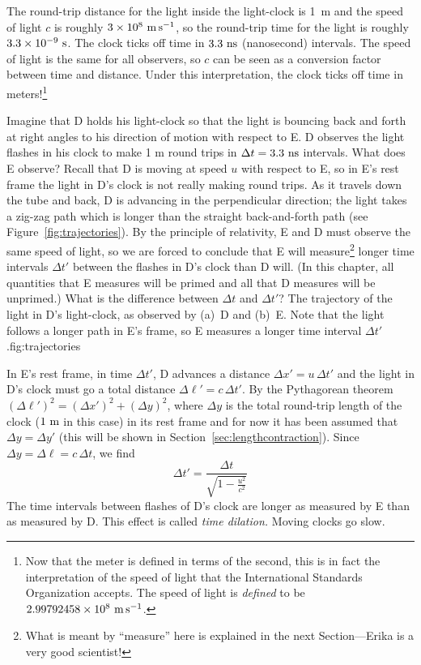 The round-trip distance for the light inside the light-clock is 1~m
and the speed of light $c$ is roughly $3\times 10^8~{\rm m\,s^{-1}}$, so the
round-trip time for the light is roughly $3.3\times 10^{-9}~{\rm s}$.
The clock ticks off time in $3.3~{\rm ns}$ (nanosecond) intervals.
The speed of light is the same for all observers, so $c$ can be seen
as a conversion factor between time and distance.  Under this
interpretation, the clock ticks off time in meters!\footnote{Now that
the meter is defined in terms of the second, this is in fact the
interpretation of the speed of light that the International Standards
Organization accepts.  The speed of light is {\em defined\/} to be
$2.99792458\times 10^8~{\rm m\,s^{-1}}$.}


Imagine that D holds his light-clock so that the light is bouncing
back and forth at right angles to his direction of motion with respect
to E.  D observes the light flashes in his clock to make 1 m round
trips in $\Delta t=3.3~{\rm ns}$ intervals.  What does E observe?
Recall that D is moving at speed $u$ with respect to E, so in E's rest
frame the light in D's clock is not really making round trips.  As it
travels down the tube and back, D is advancing in the perpendicular
direction; the light takes a zig-zag path which is longer than the
straight back-and-forth path (see Figure~\ref{fig:trajectories}).  By
the principle of relativity, E and D must observe the same speed of
light, so we are forced to conclude that E will measure\footnote{What
is meant by ``measure'' here is explained in the next Section---Erika
is a very good scientist!} longer time intervals $\Delta t'$ between
the flashes in D's clock than D will.  (In this chapter, all
quantities that E measures will be primed and all that D measures will
be unprimed.)  What is the difference between $\Delta t$ and $\Delta
t'$?
%
{The trajectory of the
light in D's light-clock, as observed by (a)~D and (b)~E.  Note that
the light follows a longer path in E's frame, so E measures a longer
time interval $\Delta t'$.}{fig:trajectories}

In E's rest frame, in time $\Delta t'$, D advances a distance $\Delta
x'=u\,\Delta t'$ and the light in D's clock must go a total distance
$\Delta\ell'=c\,\Delta t'$.  By the Pythagorean theorem
$(\Delta\ell')^2=(\Delta x')^2+(\Delta y)^2$, where $\Delta y$ is the
total round-trip length of the clock ($1~{\rm m}$ in this case) in its
rest frame and for now it has been assumed that $\Delta y=\Delta y'$
(this will be shown in Section~\ref{sec:lengthcontraction}).  Since
$\Delta y=\Delta\ell =c\,\Delta t$, we find
\begin{equation}
\Delta t'=\frac{\Delta t}{\sqrt{1-\frac{u^2}{c^2}}}
\end{equation}
The time intervals between flashes of D's clock are longer as
measured by E than as measured by D.  This effect is called {\em time
dilation.\/} Moving clocks go slow.

